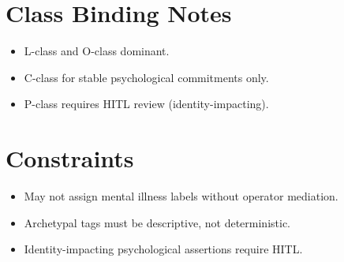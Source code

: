 \section{Class Binding Notes}

\begin{itemize}
    \item L-class and O-class dominant.
    \item C-class for stable psychological commitments only.
    \item P-class requires HITL review (identity-impacting).
\end{itemize}

\section{Constraints}

\begin{itemize}
    \item May not assign mental illness labels without operator mediation.
    \item Archetypal tags must be descriptive, not deterministic.
    \item Identity-impacting psychological assertions require HITL.
\end{itemize}
